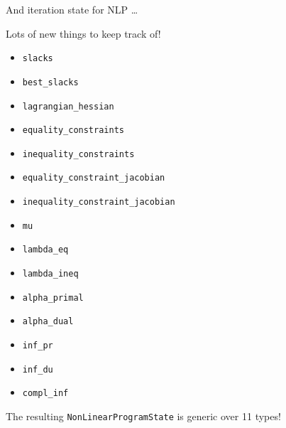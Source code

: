 \documentclass{beamer}
\begin{document}
\begin{frame}{And iteration state for NLP \dots}

  \scriptsize
  Lots of new things to keep track of!

  \vfill

  \begin{itemize}
    \item \texttt{slacks}
    \item \texttt{best\_slacks}
    \item \texttt{lagrangian\_hessian}
    \item \texttt{equality\_constraints}
    \item \texttt{inequality\_constraints}
    \item \texttt{equality\_constraint\_jacobian}
    \item \texttt{inequality\_constraint\_jacobian}
    \item \texttt{mu}
    \item \texttt{lambda\_eq}
    \item \texttt{lambda\_ineq}
    \item \texttt{alpha\_primal}
    \item \texttt{alpha\_dual}
    \item \texttt{inf\_pr}
    \item \texttt{inf\_du}
    \item \texttt{compl\_inf}
  \end{itemize}

  \vfill

  The resulting \texttt{NonLinearProgramState} is generic over 11 types!

\end{frame}
\end{document}
